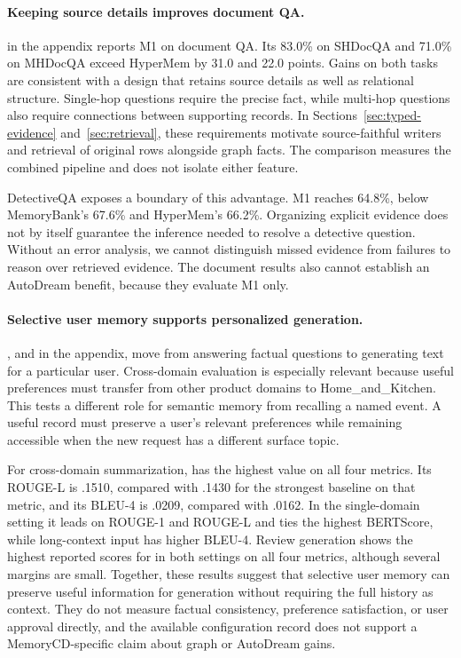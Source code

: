 \paragraph{Keeping source details improves document QA.}
 in the appendix reports M1 on document QA. Its 83.0\% on SHDocQA and
71.0\% on MHDocQA exceed HyperMem by 31.0 and 22.0 points. Gains on both tasks
are consistent with a design that retains source details as well as relational structure. Single-hop questions require the precise fact, while multi-hop
questions also require connections between supporting records. In
Sections~\ref{sec:typed-evidence} and~\ref{sec:retrieval}, these requirements
motivate source-faithful writers and retrieval of original rows alongside
graph facts. The comparison measures the combined pipeline and does not
isolate either feature.

DetectiveQA exposes a boundary of this advantage. M1 reaches 64.8\%, below
MemoryBank's 67.6\% and HyperMem's 66.2\%. Organizing explicit evidence does
not by itself guarantee the inference needed to resolve a detective question.
Without an error analysis, we cannot distinguish missed evidence from failures
to reason over retrieved evidence. The document results also cannot establish
an AutoDream benefit, because they evaluate M1 only.
\paragraph{Selective user memory supports personalized generation.}
, and  in the appendix, move from answering factual
questions to generating text for a particular user. Cross-domain evaluation is especially relevant because useful preferences must transfer from other product
domains to Home\_and\_Kitchen. This tests a different role for semantic memory
from recalling a named event. A useful record must preserve a user's relevant
preferences while remaining accessible when the new request has a different
surface topic.

For cross-domain summarization, \ours has the highest value on all four
metrics. Its ROUGE-L is .1510, compared with .1430 for the strongest baseline
on that metric, and its BLEU-4 is .0209, compared with .0162. In the
single-domain setting it leads on ROUGE-1 and ROUGE-L and ties the highest
BERTScore, while long-context input has higher BLEU-4. Review generation
shows the highest reported scores for \ours in both settings on all four
metrics, although several margins are small. Together, these results suggest
that selective user memory can preserve useful information for generation
without requiring the full history as context. They do not measure factual
consistency, preference satisfaction, or user approval directly, and the
available configuration record does not support a MemoryCD-specific claim
about graph or AutoDream gains.

